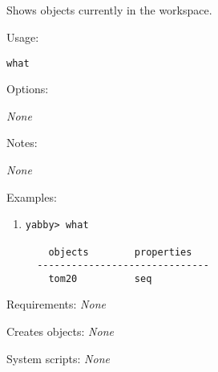 


\subsection[what]{  }



Shows objects currently in the workspace.


\begin{description}


\item{Usage:}

{\tt what}


\item{Options:}
\begin{description}
{\em None}
\end{description}


\item{Notes:}
\begin{enumerate}
{\em None}
\end{enumerate}


\item{Examples:}
\begin{enumerate}

\item
\begin{verbatim}
yabby> what

    objects        properties
  ------------------------------
    tom20          seq           

\end{verbatim}

\end{enumerate}


\item{Requirements:} {\em None}


\item{Creates objects:} {\em None}


\item{System scripts:} {\em None}

\end{description}

